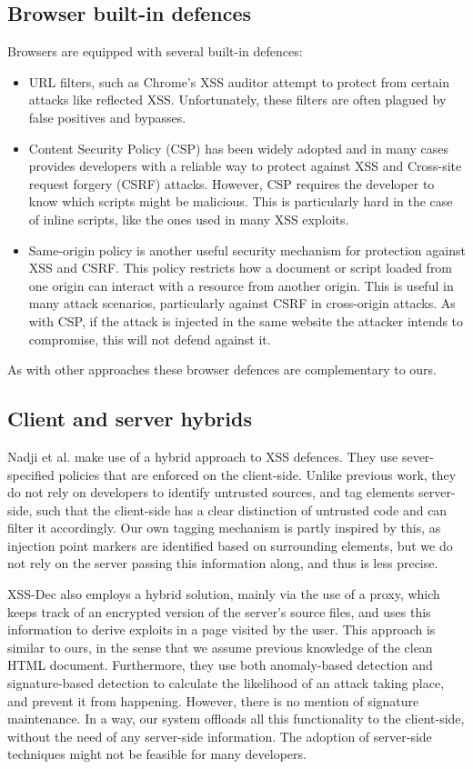 \subsection{Browser built-in defences}
Browsers are equipped with several built-in defences:
\begin{itemize}
	\item  URL filters, such as Chrome's XSS auditor attempt to protect from certain attacks like reflected XSS. Unfortunately, these filters are often plagued by false positives and bypasses.
	\item Content Security Policy (CSP) \cite{CSP} has been widely adopted and in many cases provides developers with a reliable way to protect against XSS and Cross-site request forgery (CSRF) attacks. However, CSP requires the developer to know which scripts might be malicious. This is particularly hard in the case of inline scripts, like the ones used in many XSS exploits.
	\item Same-origin policy \cite{SOP} is another useful security mechanism for protection against XSS and CSRF. This policy restricts how a document or script loaded from one origin can interact with a resource from another origin. This is useful in many attack scenarios, particularly against CSRF in cross-origin attacks. As with CSP, if the attack is injected in the same website the attacker intends to compromise, this will not defend against it.
\end{itemize}

As with other approaches these browser defences are complementary to ours.

\subsection{Client and server hybrids}
Nadji et al. \cite{Nadji:2009} make use of a hybrid approach to XSS defences. They use sever-specified policies that are enforced on the client-side. Unlike previous work, they do not rely on developers to identify untrusted sources, and tag elements server-side, such that the client-side has a clear distinction of untrusted code and can filter it accordingly. Our own tagging mechanism is partly inspired by this, as injection point markers are identified based on surrounding elements, but we do not rely on the server passing this information along, and thus is less precise.
 
XSS-Dec \cite{10.1007/978-3-642-31540-4_17} also employs a hybrid solution, mainly via the use of a proxy, which keeps track of an encrypted version of the server's source files, and uses this information to derive exploits in a page visited by the user. This approach is similar to ours, in the sense that we assume previous knowledge of the clean HTML document. Furthermore, they use both anomaly-based detection and signature-based detection to calculate the likelihood of an attack taking place, and prevent it from happening. However, there is no mention of signature maintenance. In a way, our system offloads all this functionality to the client-side, without the need of any server-side information. The adoption of server-side techniques might not be feasible for many developers.

